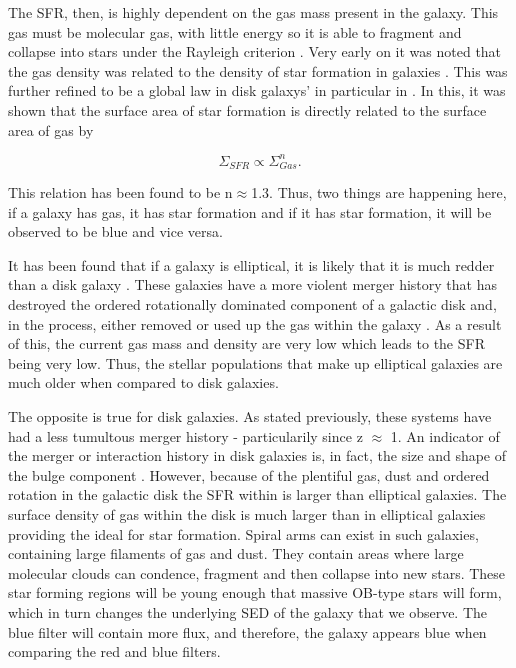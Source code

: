 The SFR, then, is highly dependent on the gas mass present in the galaxy. This gas must be molecular gas, with little energy so it is able to fragment and collapse into stars under the Rayleigh criterion \citep{Paper on the Rayleigh Criterion}. Very early on it was noted that the gas density was related to the density of star formation in galaxies \citep{1959ApJ...129..243S}. This was further refined to be a global law in disk galaxys' in particular in \citet{1998ApJ...498..541K}. In this, it was shown that the surface area of star formation is directly related to the surface area of gas by 

\begin{equation}\label{eq:ks-law}
	\Sigma_{SFR} \propto \Sigma_{Gas}^{n}. 
\end{equation}

\noindent This relation has been found to be n$\approx$1.3. Thus, two things are happening here, if a galaxy has gas, it has star formation and if it has star formation, it will be observed to be blue and vice versa.

It has been found that if a galaxy is elliptical, it is likely that it is much redder than a disk galaxy \citep{1992MNRAS.254..589B}. These galaxies have a more violent merger history that has destroyed the ordered rotationally dominated component of a galactic disk and, in the process, either removed or used up the gas within the galaxy \citep{1976ApJ...204..365F}. As a result of this, the current gas mass and density are very low which leads to the SFR being very low. Thus, the stellar populations that make up elliptical galaxies are much older when compared to disk galaxies.

The opposite is true for disk galaxies. As stated previously, these systems have had a less tumultous merger history - particularily since z $\approx$ 1. An indicator of the merger or interaction history in disk galaxies is, in fact, the size and shape of the bulge component \citep{2011MNRAS.414..888E}. However, because of the plentiful gas, dust and ordered rotation in the galactic disk the SFR within is larger than elliptical galaxies. The surface density of gas within the disk is much larger than in elliptical galaxies providing the ideal for star formation. Spiral arms can exist in such galaxies, containing large filaments of gas and dust. They contain areas where large molecular clouds can condence, fragment and then collapse into new stars. These star forming regions will be young enough that massive OB-type stars will form, which in turn changes the underlying SED of the galaxy that we observe. The blue filter will contain more flux, and therefore, the galaxy appears blue when comparing the red and blue filters.

